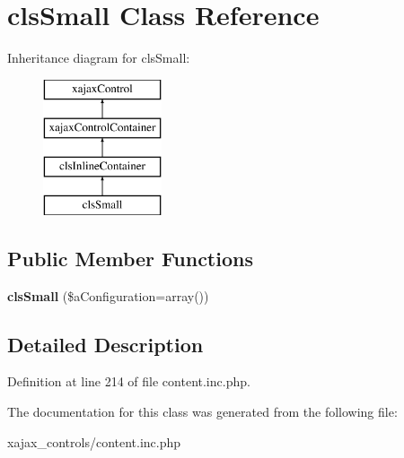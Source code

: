 \hypertarget{classclsSmall}{
\section{clsSmall Class Reference}
\label{classclsSmall}
}
Inheritance diagram for clsSmall:\begin{figure}[H]
\begin{center}
\leavevmode
\includegraphics[height=4.000000cm]{classclsSmall}
\end{center}
\end{figure}
\subsection*{Public Member Functions}
\begin{DoxyCompactItemize}
\item 
\hypertarget{classclsSmall_a8996d83d656507fbb6f343b8f0a48bf8}{
{\bfseries clsSmall} (\$aConfiguration=array())}
\label{classclsSmall_a8996d83d656507fbb6f343b8f0a48bf8}

\end{DoxyCompactItemize}


\subsection{Detailed Description}


Definition at line 214 of file content.inc.php.



The documentation for this class was generated from the following file:\begin{DoxyCompactItemize}
\item 
xajax\_\-controls/content.inc.php\end{DoxyCompactItemize}

